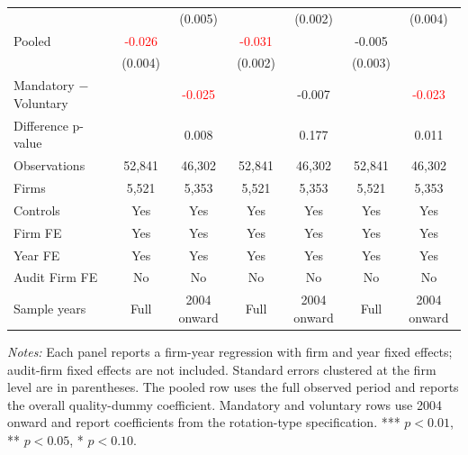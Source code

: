 \begin{table}[htbp]
\begin{threeparttable}
{\begin{tabular}{l cc cc cc}
 &  & (0.005) &  & (0.002) &  & (0.004) \\
Pooled & \textcolor{red}{-0.026\sym{***}} &  & \textcolor{red}{-0.031\sym{***}} &  & -0.005 &  \\
 & (0.004) &  & (0.002) &  & (0.003) &  \\
Mandatory $-$ Voluntary &  & \textcolor{red}{-0.025\sym{***}} &  & -0.007 &  & \textcolor{red}{-0.023\sym{**}} \\
Difference p-value &  & 0.008 &  & 0.177 &  & 0.011 \\
Observations & 52,841 & 46,302 & 52,841 & 46,302 & 52,841 & 46,302 \\
Firms & 5,521 & 5,353 & 5,521 & 5,353 & 5,521 & 5,353 \\
\midrule
Controls & Yes & Yes & Yes & Yes & Yes & Yes \\
Firm FE & Yes & Yes & Yes & Yes & Yes & Yes \\
Year FE & Yes & Yes & Yes & Yes & Yes & Yes \\
Audit Firm FE & No & No & No & No & No & No \\
Sample years & Full & 2004 onward & Full & 2004 onward & Full & 2004 onward \\
\bottomrule
\end{tabular}}
\begin{tablenotes}\footnotesize
\item \textit{Notes:} Each panel reports a firm-year regression with firm and year fixed effects; audit-firm fixed effects are not included. Standard errors clustered at the firm level are in parentheses. The pooled row uses the full observed period and reports the overall quality-dummy coefficient. Mandatory and voluntary rows use 2004 onward and report coefficients from the rotation-type specification. *** \(p<0.01\), ** \(p<0.05\), * \(p<0.10\).
\end{tablenotes}
\end{threeparttable}
\end{table}
